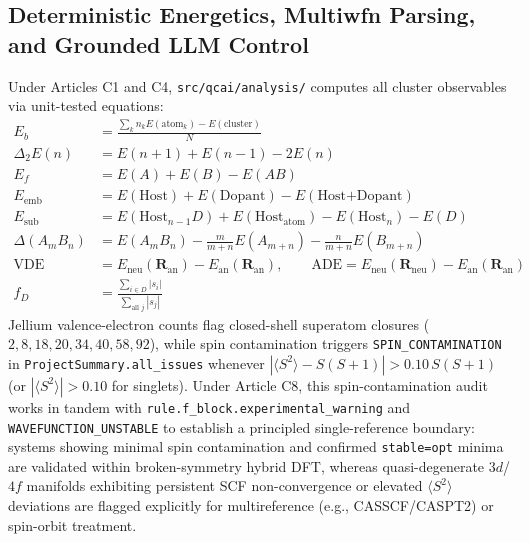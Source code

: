 \documentclass[journal=jctcce,manuscript=article]{achemso}
\begin{document}
\subsection{Deterministic Energetics, Multiwfn Parsing, and Grounded LLM Control}

Under Articles C1 and C4, \texttt{src/qcai/analysis/} computes all cluster observables via unit-tested equations:
\begin{align}
  E_b &= \frac{\sum_k n_k E(\text{atom}_k) - E(\text{cluster})}{N} \label{eq:eb} \\
  \Delta_2 E(n) &= E(n+1) + E(n-1) - 2E(n) \label{eq:d2e} \\
  E_f &= E(A) + E(B) - E(AB) \label{eq:ef} \\
  E_{\text{emb}} &= E(\text{Host}) + E(\text{Dopant}) - E(\text{Host+Dopant}) \label{eq:eemb} \\
  E_{\text{sub}} &= E(\text{Host}_{n-1}D) + E(\text{Host}_{\text{atom}}) - E(\text{Host}_n) - E(D) \label{eq:esub} \\
  \Delta(A_m B_n) &= E(A_m B_n) - \frac{m}{m+n}E(A_{m+n}) - \frac{n}{m+n}E(B_{m+n}) \label{eq:mix} \\
  \text{VDE} &= E_{\text{neu}}(\mathbf{R}_{\text{an}}) - E_{\text{an}}(\mathbf{R}_{\text{an}}), \qquad
  \text{ADE} = E_{\text{neu}}(\mathbf{R}_{\text{neu}}) - E_{\text{an}}(\mathbf{R}_{\text{an}}) \label{eq:pes} \\
  f_D &= \frac{\sum_{i \in D}|s_i|}{\sum_{\text{all } j}|s_j|} \label{eq:fd}
\end{align}
Jellium valence-electron counts flag closed-shell superatom closures ($2, 8, 18, 20, 34, 40, 58, 92$), while spin contamination triggers \texttt{SPIN\_CONTAMINATION} in \texttt{ProjectSummary.all\_issues} whenever $|\langle S^2 \rangle - S(S+1)| > 0.10\,S(S+1)$ (or $|\langle S^2 \rangle| > 0.10$ for singlets). Under Article C8, this spin-contamination audit works in tandem with \texttt{rule.f\_block.experimental\_warning} and \texttt{WAVEFUNCTION\_UNSTABLE} to establish a principled single-reference boundary: systems showing minimal spin contamination and confirmed \texttt{stable=opt} minima are validated within broken-symmetry hybrid DFT, whereas quasi-degenerate $3d$/$4f$ manifolds exhibiting persistent SCF non-convergence or elevated $\langle S^2 \rangle$ deviations are flagged explicitly for multireference (e.g., CASSCF/CASPT2) or spin-orbit treatment.
\end{document}
